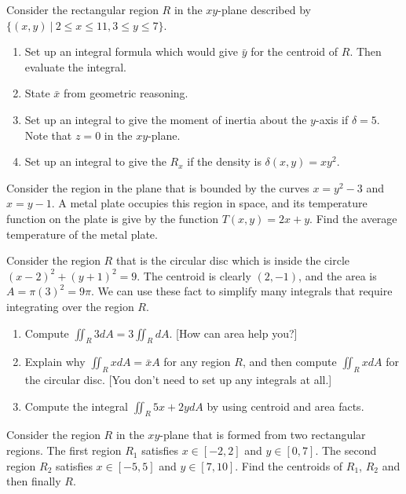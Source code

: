 \begin{problem}
Consider the rectangular region $R$ in the $xy$-plane described by $\{(x,y)\ |\ 2\leq x\leq 11, 3\leq y\leq 7\}$.
\begin{enumerate}
 \item Set up an integral formula which would give $\bar y$ for the centroid of $R$.  Then evaluate the integral.
 \item State $\bar x$ from geometric reasoning.
 \item Set up an integral to give the moment of inertia about the $y$-axis if $\delta=5$. Note that $z=0$ in the $xy$-plane.
 \item Set up an integral to give the $R_x$ if the density is $\delta(x,y)=xy^2$.
\end{enumerate}
\end{problem}

\begin{problem}
 Consider the region in the plane that is bounded by the curves $x=y^2-3$ and $x=y-1$.  A metal plate occupies this region in space, and its temperature function on the plate is give by the function $T(x,y)=2x+y$.  Find the average temperature of the metal plate.
\end{problem}

\begin{problem}\label{centroid trick}
Consider the region $R$ that is the circular disc which is inside the circle $(x-2)^2+(y+1)^2=9$. The centroid is clearly $(2,-1)$, and the area is $A=\pi(3)^2=9\pi$.  We can use these fact to simplify many integrals that require integrating over the region $R$.  
\begin{enumerate}
 \item Compute $\iint_R 3dA = 3\iint_RdA$.  [How can area help you?]
 \item Explain why $\iint_R x dA = \bar x A$ for any region $R$, and then compute $\iint_R x dA$ for the circular disc. [You don't need to set up any integrals at all.]
 \item Compute the integral $\iint_R 5x+2y dA$ by using centroid and area facts.
\end{enumerate}
\end{problem}

\begin{problem}
Consider the region $R$ in the $xy$-plane that is formed from two rectangular regions.  The first region $R_1$ satisfies $x\in[-2,2]$ and $y\in[0,7]$.  The second region $R_2$ satisfies $x\in[-5,5]$ and $y\in[7,10]$.  Find the centroids of $R_1$, $R_2$ and then finally $R$.
\end{problem}


